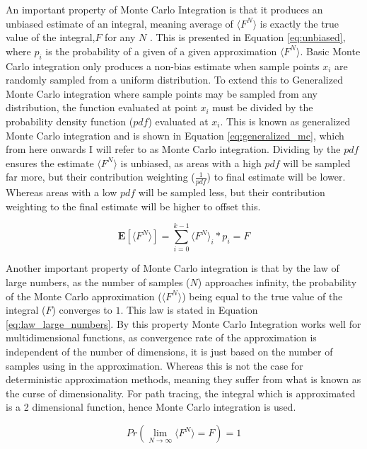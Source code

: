\documentclass[ %
                    author={Callum Pearce},
                supervisor={Dr. Neill Campbell},
                    degree={MEng},
                     title={How effective are Temporal difference learning methods for reducing the number of zero contribution light paths while still accurately approximating Global Illumination in Path tracing?},
                  subtitle={},
                      type={research},
                      year={2019} ]{dissertation}
\begin{document}
An important property of Monte Carlo Integration is that it produces an unbiased estimate of an integral, meaning average of $\langle F^N \rangle$ is exactly the true value of the integral,$F$ for any $N$ \cite{morokoff1995quasi}. This is presented in Equation \ref{eq:unbiased}, where $p_i$ is the probability of a given of a given approximation $\langle F^N \rangle$. Basic Monte Carlo integration only produces a non-bias estimate when sample points $x_i$ are randomly sampled from a uniform distribution. To extend this to Generalized Monte Carlo integration where sample points may be sampled from any distribution, the function evaluated at point $x_i$ must be divided by the probability density function ($pdf$) evaluated at $x_i$. This is known as generalized Monte Carlo integration and is shown in Equation \ref{eq:generalized_mc}, which from here onwards I will refer to as Monte Carlo integration. Dividing by the $pdf$ ensures the estimate $\langle F^N \rangle$ is unbiased, as areas with a high $pdf$ will be sampled far more, but their contribution weighting ($\frac{1}{pdf}$) to final estimate will be lower. Whereas areas with a low $pdf$ will be sampled less, but their contribution weighting to the final estimate will be higher to offset this.

\begin{equation}
\label{eq:unbiased}
\mathbf{E}[\langle F^N \rangle] = \sum_{i = 0}^{k-1} \langle F^N \rangle_i * p_i =  F
\end{equation}

Another important property of Monte Carlo integration is that by the law of large numbers, as the number of samples ($N$) approaches infinity, the probability of the Monte Carlo approximation ($\langle F^N \rangle$) being equal to the true value of the integral ($F$) converges to $1$. This law is stated in Equation \ref{eq:law_large_numbers}. By this property Monte Carlo Integration works well for multidimensional functions, as convergence rate of the approximation is independent of the number of dimensions, it is just based on the number of samples using in the approximation. Whereas this is not the case for deterministic approximation methods, meaning they  suffer from what is known as the curse of dimensionality. For path tracing, the integral which is approximated is a 2 dimensional function, hence Monte Carlo integration is used. 

\begin{equation}
\label{eq:law_large_numbers}
Pr( \lim_{N \rightarrow \infty} \langle F^N \rangle = F ) = 1
\end{equation}
\end{document}
